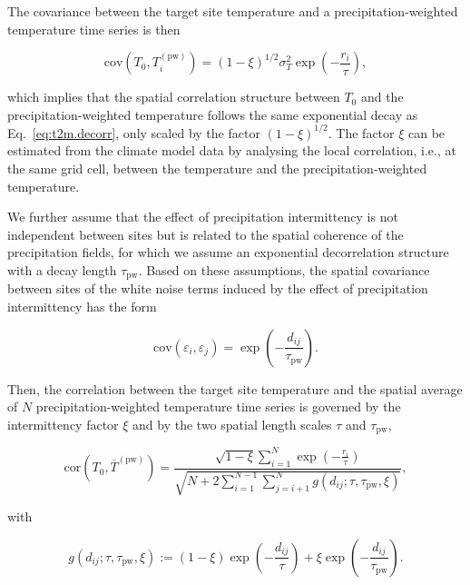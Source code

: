 \documentclass[draft]{agujournal2019}
\begin{document}
The covariance between the target site temperature and a precipitation-weighted
temperature time series is then
\begin{linenomath*}
\begin{equation}
\label{eq:t2m.pw.decorr}
\mathrm{cov}(T_0,T_i^{\mathrm{(pw)}})=
(1-\xi)^{1/2}\sigma_T^2\exp{\left(-\frac{r_i}{\tau}\right)},
\end{equation}
\end{linenomath*}
%
which implies that the spatial correlation structure between $T_0$ and the
precipitation-weighted temperature follows the same exponential decay as
Eq.~\eqref{eq:t2m.decorr}, only scaled by the factor $(1-\xi)^{1/2}$. The factor
$\xi$ can be estimated from the climate model data by analysing the local
correlation, i.e., at the same grid cell, between the temperature and the
precipitation-weighted temperature.

We further assume that the effect of precipitation intermittency is not
independent between sites but is related to the spatial coherence of the
precipitation fields, for which we assume an exponential decorrelation structure
with a decay length $\tau_{\mathrm{pw}}$. Based on these assumptions, the
spatial covariance between sites of the white noise terms induced by the effect
of precipitation intermittency has the form
%
\begin{linenomath*}
\begin{equation}
\label{eq:noise.cov}
\mathrm{cov}(\varepsilon_i,\varepsilon_j)=
\exp{\left(-\frac{d_{ij}}{\tau_{\mathrm{pw}}}\right)}.
\end{equation}
\end{linenomath*}
%
Then, the correlation between the target site temperature and the spatial
average of $N$ precipitation-weighted temperature time series is governed by the
intermittency factor $\xi$ and by the two spatial length scales $\tau$ and
$\tau_{\mathrm{pw}}$,
%
\begin{linenomath*}
\begin{equation}
\label{eq:t2m.pw.corr}
\mathrm{cor}\left(T_0,\overline{T}^{\mathrm{(pw)}}\right)=
\frac
{\sqrt{1-\xi}\sum_{i=1}^{N}\exp{\left(-\frac{r_i}{\tau}\right)}}
{\sqrt{N + 2\sum_{i=1}^{N-1}\sum_{j=i+1}^{N}
  g(d_{ij}; \tau, \tau_{\mathrm{pw}}, \xi)}},
\end{equation}
\end{linenomath*}
%
with
\begin{linenomath*}
\begin{equation}
\label{eq:exp.fun}
g(d_{ij}; \tau, \tau_{\mathrm{pw}}, \xi):=
(1-\xi)\exp{\left(-\frac{d_{ij}}{\tau}\right)} +
\xi\exp{\left(-\frac{d_{ij}}{\tau_{\mathrm{pw}}}\right)}.
\end{equation}
\end{linenomath*}
\end{document}
